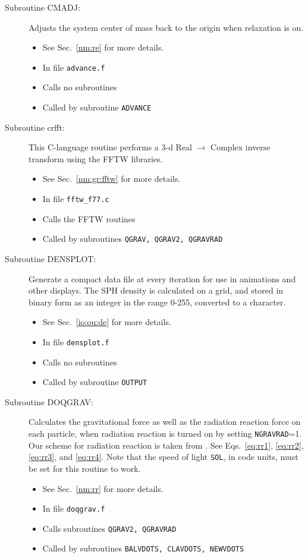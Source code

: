\begin{description}
\item[Subroutine CMADJ:] Adjusts the system center of mass back to the
origin when relaxation is on.
\begin{itemize} 
\item See Sec.~\ref{nm:re} for more details.
\item In file {\tt advance.f}
\item Calls no subroutines 
\item Called by subroutine {\tt ADVANCE}
\end{itemize} 

\item[Subroutine crfft:] This C-language routine performs a 3-d
Real $\rightarrow$ Complex inverse transform using the FFTW libraries.
\begin{itemize} 
\item See Sec.~\ref{nm:gr:fftw} for more details.
\item In file {\tt fftw\_f77.c}
\item Calls the FFTW routines
\item Called by subroutines {\tt QGRAV, QGRAV2, QGRAVRAD}
\end{itemize} 

\item[Subroutine DENSPLOT:] Generate a compact data file
at every iteration for use in animations and other displays.  
The SPH density is calculated on a grid, and stored in binary form
as an integer in the range 0-255, converted to a character.
\begin{itemize} 
\item See Sec.~\ref{io:ou:de} for more details.
\item In file {\tt densplot.f}
\item Calls no subroutines 
\item Called by subroutine {\tt OUTPUT}
\end{itemize} 

\item[Subroutine DOQGRAV:] Calculates the gravitational force 
as well as the radiation reaction force on each particle, when radiation
reaction is turned on by setting {\tt NGRAVRAD}=1.  
Our scheme for radiation reaction is taken from
\citet{BDS}.  See
Eqs.~\ref{eq:rr1}, \ref{eq:rr2}, \ref{eq:rr3}, and \ref{eq:rr4}.
Note that the speed of light {\tt SOL}, in code units, must be set for
this routine to work.
\begin{itemize} 
\item See Sec.~\ref{nm:rr} for more details.
\item In file {\tt doqgrav.f}
\item Calls subroutines {\tt QGRAV2, QGRAVRAD} 
\item Called by subroutines {\tt BALVDOTS, CLAVDOTS, NEWVDOTS}
\end{itemize} 


\end{description}

